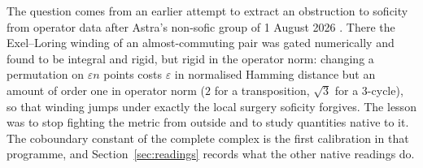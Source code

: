 \documentclass[11pt]{article}
\theoremstyle{remark}\newtheorem{remark}[theorem]{Remark}
\begin{document}
The question comes from an earlier attempt to extract an obstruction to soficity from operator data after Astra's non-sofic group of 1 August 2026 \cite{trace}. There the Exel--Loring winding of an almost-commuting pair \cite{EL} was gated numerically and found to be integral and rigid, but rigid in the operator norm: changing a permutation on $\varepsilon n$ points costs $\varepsilon$ in normalised Hamming distance but an amount of order one in operator norm ($2$ for a transposition, $\sqrt3$ for a 3-cycle), so that winding jumps under exactly the local surgery soficity forgives. The lesson was to stop fighting the metric from outside and to study quantities native to it. The coboundary constant of the complete complex is the first calibration in that programme, and Section~\ref{sec:readings} records what the other native readings do.
\end{document}
